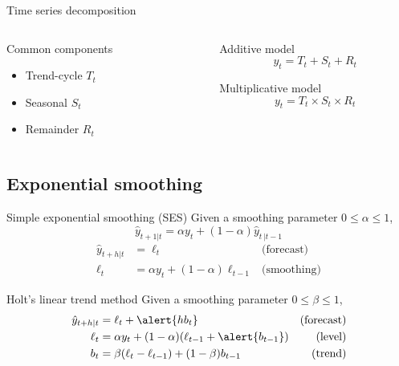 \documentclass[12pt,aspectratio=169]{beamer}
\begin{document}
\begin{frame}{Time series decomposition}
    \begin{columns}
        \begin{column}{0.5\textwidth}
            \begin{block}{Common components}
                \begin{itemize}
                    \item Trend\hyp{}cycle $T_{t}$
                    \item Seasonal $S_{t}$
                    \item Remainder $R_{t}$
                \end{itemize}
            \end{block}
        \end{column}
        \begin{column}{0.5\textwidth}
            \begin{block}{Additive model}
                \[
                    y_{t} = T_{t} + S_{t} + R_{t}
                \]
            \end{block}
            \vfill
            \begin{block}{Multiplicative model}
                \[
                    y_{t} = T_{t} \times S_{t} \times R_{t}
                \]
            \end{block}
        \end{column}
    \end{columns}
\end{frame}

\subsection{Exponential smoothing}

\begin{frame}{Simple exponential smoothing (SES)}
    Given a smoothing parameter $0 \leq \alpha \leq 1$,
    \[
        \hat{y}_{t + 1 | t} = \alpha y_{t} + (1 - \alpha) \hat{y}_{t\,| t - 1}
    \]
    \vfill
    \begin{align*}
        \hat{y}_{t + h | t} &= \ell_{t}                               & \text{(forecast)} \\
        \ell_{t}            &= \alpha y_{t} + (1 - \alpha) \ell_{t-1} & \text{(smoothing)}
    \end{align*}
\end{frame}

\begin{frame}{Holt's linear trend method}
    Given a smoothing parameter $0 \leq \beta \leq 1$,
    \begin{align*}
        \hat{y}_{t + h | t} &= \ell_{t} + \alert{h b_{t}}                                 & \text{(forecast)} \\
        \ell_{t}            &= \alpha y_{t} + (1 - \alpha) (\ell_{t-1} + \alert{b_{t-1}}) & \text{(level)} \\
        b_{t}               &= \beta (\ell_{t} - \ell_{t-1}) + (1 - \beta) b_{t-1}        & \text{(trend)}
    \end{align*}
\end{frame}
\end{document}
